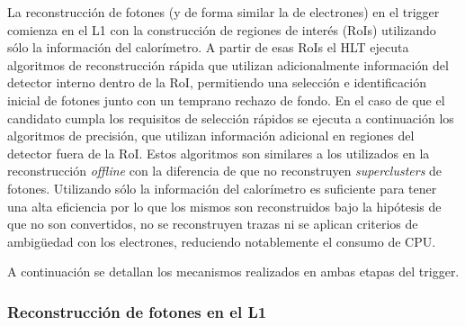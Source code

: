 La reconstrucción de fotones \cite{TRIG-2018-05} (y de forma similar la de electrones) en el trigger comienza en el L1 con la construcción de regiones de interés (RoIs) utilizando sólo la información del calorímetro. A partir de esas RoIs el HLT ejecuta algoritmos de reconstrucción rápida que utilizan adicionalmente información del detector interno dentro de la RoI, permitiendo una selección e identificación inicial de fotones junto con un temprano rechazo de fondo. En el caso de que el candidato cumpla los requisitos de selección rápidos se ejecuta a continuación los algoritmos de precisión, que utilizan información adicional en regiones del detector fuera de la RoI. Estos algoritmos son similares a los utilizados en la reconstrucción \textit{offline} con la diferencia de que no reconstruyen \textit{superclusters} de fotones. Utilizando sólo la información del calorímetro es suficiente para tener una alta eficiencia por lo que los mismos son reconstruidos bajo la hipótesis de que no son convertidos, no se reconstruyen trazas ni se aplican criterios de ambigüedad con los electrones, reduciendo notablemente el consumo de CPU. 

A continuación se detallan los mecanismos realizados en ambas etapas del trigger.

\subsubsection{Reconstrucción de fotones en el L1}

